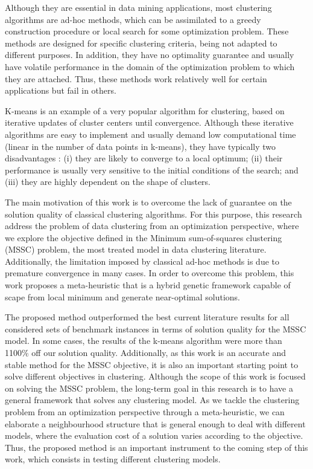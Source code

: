 Although they are essential in data mining applications, most clustering algorithms are ad-hoc methods, which can be assimilated to a greedy construction procedure or local search for some optimization problem. These methods are designed for specific clustering criteria, being not adapted to different purposes. In addition, they have no optimality guarantee and usually have volatile performance in the domain of the optimization problem to which they are attached. Thus, these methods work relatively well for certain applications but fail in others.

K-means is an example of a very popular algorithm for clustering, based on iterative updates of cluster centers until convergence. Although these iterative algorithms are easy to implement and usually demand low computational time (linear in the number of data points in k-means), they have typically two disadvantages \cite{Das2009}: (i) they are likely to converge to a local optimum; (ii) their performance is usually very sensitive to the initial conditions of the search; and (iii) they are highly dependent on the shape of clusters.

The main motivation of this work is to overcome the lack of guarantee on the solution quality of classical clustering algorithms. For this purpose, this research address the problem of data clustering from an optimization perspective, where we explore the objective defined in the Minimum sum-of-squares clustering (MSSC) problem, the most treated model in data clustering literature. Additionally, the limitation imposed by classical ad-hoc methods is due to premature convergence in many cases. In order to overcome this problem, this work proposes a meta-heuristic that is a hybrid genetic framework capable of scape from local minimum and generate near-optimal solutions.


The proposed method outperformed the best current literature results for all considered sets of benchmark
instances in terms of solution quality for the MSSC model. In some cases, the results of the k-means algorithm were more than 1100\% off our solution quality. Additionally, as this work is an accurate and stable method for the MSSC objective, it is also an important starting point to solve different objectives in clustering. Although the scope of this work is focused on solving the MSSC problem, the long-term goal in this research is to have a general framework that solves any clustering model. As we tackle the clustering problem from an optimization perspective through a meta-heuristic, we can elaborate a neighbourhood structure that is general enough to deal with different models, where the evaluation cost of a solution varies according to the objective. Thus, the proposed method is an important instrument to the coming step of this work, which consists in testing different clustering models.

